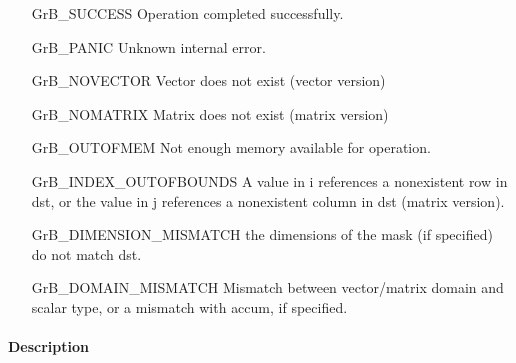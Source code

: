 \begin{itemize}[leftmargin=2.1in]
\item[{\sf GrB\_SUCCESS}]             Operation completed successfully.
\item[{\sf GrB\_PANIC}]               Unknown internal error.
\item[{\sf GrB\_NOVECTOR}]            Vector does not exist (vector version)
\item[{\sf GrB\_NOMATRIX}]            Matrix does not exist (matrix version)
\item[{\sf GrB\_OUTOFMEM}]            Not enough memory available for operation.
\item[{\sf GrB\_INDEX\_OUTOFBOUNDS}]
        A value in i references a nonexistent row in dst, or
        the value in j references a nonexistent column in dst (matrix version).
\item[{\sf GrB\_DIMENSION\_MISMATCH}] 
        the dimensions of the mask (if specified) do not match dst.
\item[{\sf GrB\_DOMAIN\_MISMATCH}]    Mismatch between vector/matrix domain and scalar type,
                                      or a mismatch with {\sf accum}, if specified.
\end{itemize}


\paragraph{Description}
